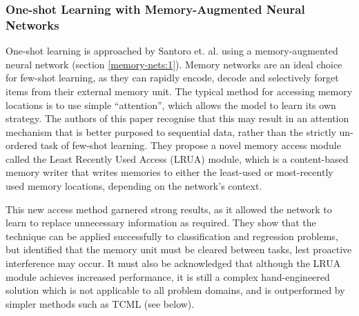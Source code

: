 \documentclass{report}
\begin{document}
\subsubsection{One-shot Learning with Memory-Augmented Neural Networks}
One-shot learning is approached by Santoro et. al. \parencite{oslwmann} using a memory-augmented neural network (section \ref{memory-nets:1}). Memory networks are an ideal choice for few-shot learning, as they can rapidly encode, decode and selectively forget items from their external memory unit. The typical method for accessing memory locations is to use simple ``attention'', which allows the model to learn its own strategy. The authors of this paper recognise that this may result in an attention mechanism that is better purposed to sequential data, rather than the strictly un-ordered task of few-shot learning. They propose a novel memory access module called the Least Recently Used Access (LRUA) module, which is a content-based memory writer that writes memories to either the least-used or most-recently used memory locations, depending on the network's context. \par
This new access method garnered strong results, as it allowed the network to learn to replace unnecessary information as required. They show that the technique can be applied successfully to classification and regression problems, but identified that the memory unit must be cleared between tasks, lest proactive interference may occur. It must also be acknowledged that although the LRUA module achieves increased performance, it is still a complex hand-engineered solution which is not applicable to all problem domains, and is outperformed by simpler methods such as TCML (see below).  \par
\end{document}
